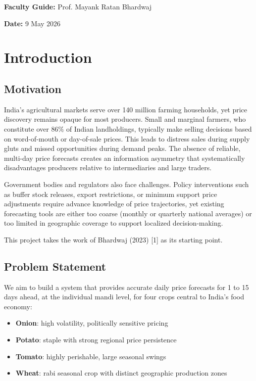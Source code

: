 \documentclass[12pt]{article}
\begin{document}
\textbf{Faculty Guide:} Prof. Mayank Ratan Bhardwaj

\textbf{Date:} 9 May 2026

\section{Introduction}

\subsection{Motivation}

India's agricultural markets serve over 140 million farming households, yet price discovery remains opaque for most producers. Small and marginal farmers, who constitute over 86\% of Indian landholdings, typically make selling decisions based on word-of-mouth or day-of-sale prices. This leads to distress sales during supply gluts and missed opportunities during demand peaks. The absence of reliable, multi-day price forecasts creates an information asymmetry that systematically disadvantages producers relative to intermediaries and large traders.

Government bodies and regulators also face challenges. Policy interventions such as buffer stock releases, export restrictions, or minimum support price adjustments require advance knowledge of price trajectories, yet existing forecasting tools are either too coarse (monthly or quarterly national averages) or too limited in geographic coverage to support localized decision-making.

This project takes the work of Bhardwaj (2023) [1] as its starting point.

\subsection{Problem Statement}

We aim to build a system that provides accurate daily price forecasts for 1 to 15 days ahead, at the individual mandi level, for four crops central to India's food economy:

\begin{itemize}
\item \textbf{Onion}: high volatility, politically sensitive pricing
\item \textbf{Potato}: staple with strong regional price persistence
\item \textbf{Tomato}: highly perishable, large seasonal swings
\item \textbf{Wheat}: rabi seasonal crop with distinct geographic production zones
\end{itemize}
\end{document}
